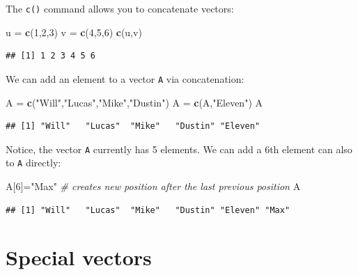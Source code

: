 \documentclass[
]{book}
\newenvironment{Shaded}{\begin{snugshade}}{\end{snugshade}}
\newcommand{\CommentTok}[1]{\textcolor[rgb]{0.56,0.35,0.01}{\textit{#1}}}
\newcommand{\DecValTok}[1]{\textcolor[rgb]{0.00,0.00,0.81}{#1}}
\newcommand{\FunctionTok}[1]{\textcolor[rgb]{0.13,0.29,0.53}{\textbf{#1}}}
\newcommand{\NormalTok}[1]{#1}
\newcommand{\OtherTok}[1]{\textcolor[rgb]{0.56,0.35,0.01}{#1}}
\newcommand{\StringTok}[1]{\textcolor[rgb]{0.31,0.60,0.02}{#1}}
\theoremstyle{definition}
\theoremstyle{definition}
\theoremstyle{definition}
\theoremstyle{definition}
\theoremstyle{remark}
\begin{document}
The \texttt{c()} command allows you to concatenate vectors:

\begin{Shaded}
\begin{Highlighting}[]
\NormalTok{u }\OtherTok{=} \FunctionTok{c}\NormalTok{(}\DecValTok{1}\NormalTok{,}\DecValTok{2}\NormalTok{,}\DecValTok{3}\NormalTok{)}
\NormalTok{v }\OtherTok{=} \FunctionTok{c}\NormalTok{(}\DecValTok{4}\NormalTok{,}\DecValTok{5}\NormalTok{,}\DecValTok{6}\NormalTok{)}
\FunctionTok{c}\NormalTok{(u,v)}
\end{Highlighting}
\end{Shaded}

\begin{verbatim}
## [1] 1 2 3 4 5 6
\end{verbatim}

We can add an element to a vector \texttt{A} via concatenation:

\begin{Shaded}
\begin{Highlighting}[]
\NormalTok{A }\OtherTok{=} \FunctionTok{c}\NormalTok{(}\StringTok{"Will"}\NormalTok{,}\StringTok{"Lucas"}\NormalTok{,}\StringTok{"Mike"}\NormalTok{,}\StringTok{"Dustin"}\NormalTok{)}
\NormalTok{A }\OtherTok{=} \FunctionTok{c}\NormalTok{(A,}\StringTok{"Eleven"}\NormalTok{)}
\NormalTok{A}
\end{Highlighting}
\end{Shaded}

\begin{verbatim}
## [1] "Will"   "Lucas"  "Mike"   "Dustin" "Eleven"
\end{verbatim}

Notice, the vector \texttt{A} currently has 5 elements. We can add a 6th element can also to \texttt{A} directly:

\begin{Shaded}
\begin{Highlighting}[]
\NormalTok{A[}\DecValTok{6}\NormalTok{]}\OtherTok{=}\StringTok{"Max"} \CommentTok{\# creates new position after the last previous position}
\NormalTok{A}
\end{Highlighting}
\end{Shaded}

\begin{verbatim}
## [1] "Will"   "Lucas"  "Mike"   "Dustin" "Eleven" "Max"
\end{verbatim}

\section{Special vectors}\label{special-vectors}
\end{document}
